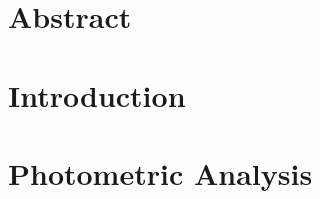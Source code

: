 \documentclass[12pt]{article}
\providecommand\phantomsection{} %
\begin{document}
\newpage
\phantomsection
{}
\section*{\centering Abstract}

\newpage
{}


\section{Introduction}
\label{sec:introduction}

%
%
%
%
%

\section{Photometric Analysis}
\label{sec:photometry}
\end{document}
